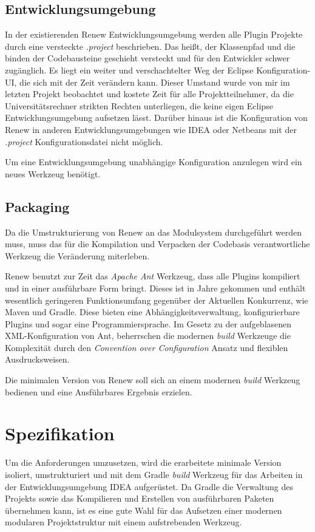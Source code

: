 \subsection{Entwicklungsumgebung} 
In der existierenden Renew Entwicklungsumgebung werden alle Plugin Projekte durch eine versteckte \textit{.project} beschrieben. Das heißt, der Klassenpfad und die binden der Codebausteine geschieht versteckt und für den Entwickler schwer zugänglich. Es liegt ein weiter und verschachtelter Weg der Eclipse Konfiguration-UI, die sich mit der Zeit verändern kann. Dieser Umstand wurde von mir im letzten Projekt beobachtet und kostete Zeit für alle Projektteilnehmer, da die Universitätsrechner strikten Rechten unterliegen, die keine eigen Eclipse Entwicklungsumgebung aufsetzen lässt. Darüber hinaus ist die Konfiguration von Renew in anderen Entwicklungsumgebungen wie IDEA oder Netbeans mit der \textit{.project} Konfigurationsdatei nicht möglich.
\bigbreak

Um eine Entwicklungsumgebung unabhängige Konfiguration anzulegen wird ein neues Werkzeug benötigt. 

\subsection{Packaging}
Da die Umstrukturierung von Renew an das Modulsystem durchgeführt werden muss, muss das für die Kompilation und Verpacken der Codebasis verantwortliche Werkzeug die Veränderung miterleben. 


Renew benutzt zur Zeit das \textit{Apache Ant} Werkzeug, dass alle Plugins kompiliert und in einer ausführbare Form bringt. Dieses ist in Jahre gekommen und enthält wesentlich geringeren Funktionsumfang gegenüber der Aktuellen Konkurrenz, wie Maven und Gradle. Diese bieten eine Abhängigkeitsverwaltung, konfigurierbare Plugins und sogar eine Programmiersprache. Im Gesetz zu der aufgeblasenen XML-Konfiguration von Ant, beherrschen die modernen \textit{build} Werkzeuge die Komplexität durch den \textit{Convention over Configuration} Ansatz und flexiblen Ausdrucksweisen. 
\bigbreak

Die minimalen Version von Renew soll sich an einem modernen \textit{build} Werkzeug bedienen und eine Ausführbares Ergebnis erzielen.


\section{Spezifikation}
Um die Anforderungen umzusetzen, wird die erarbeitete minimale Version isoliert, umstrukturiert und mit dem Gradle \textit{build} Werkzeug für das Arbeiten in der Entwicklungsumgebung IDEA aufgerüstet. Da Gradle die Verwaltung des Projekts sowie das Kompilieren und Erstellen von ausführbaren Paketen übernehmen kann, ist es eine gute Wahl für das Aufsetzen einer modernen modularen Projektstruktur mit einem aufstrebenden Werkzeug. 


